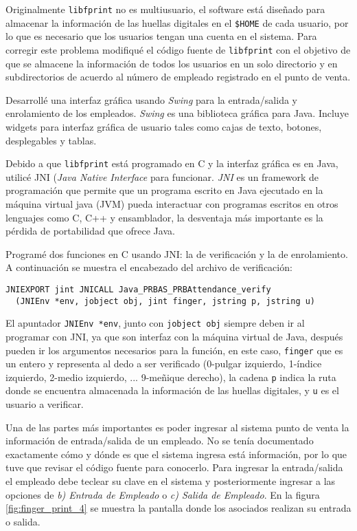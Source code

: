 Originalmente \texttt{libfprint} no es multiusuario, el software está diseñado para almacenar la información de las huellas digitales en el \texttt{\$HOME} de cada usuario, por lo que es necesario que los usuarios tengan una cuenta en el sistema. Para corregir este problema modifiqué el código fuente de \texttt{libfprint} con el objetivo de que se almacene la información de todos los usuarios en un solo directorio y en subdirectorios de acuerdo al número de empleado registrado en el punto de venta.

Desarrollé una interfaz gráfica usando \textit{Swing} para la entrada/salida y enrolamiento de los empleados. \textit{Swing} es una biblioteca gráfica para Java. Incluye widgets para interfaz gráfica de usuario tales como cajas de texto, botones, desplegables y tablas.

Debido a que \texttt{libfprint} está programado en C y la interfaz gráfica es en Java, utilicé JNI (\textit{Java Native Interface} para funcionar. \textit{JNI} es un framework de programación que permite que un programa escrito en Java ejecutado en la máquina virtual java (JVM) pueda interactuar con programas escritos en otros lenguajes como C, C++ y ensamblador, la desventaja más importante es la pérdida de portabilidad que ofrece Java.

Programé dos funciones en C usando JNI: la de verificación y la de enrolamiento. A continuación se muestra el encabezado del archivo de verificación:

\begin{Verbatim}
JNIEXPORT jint JNICALL Java_PRBAS_PRBAttendance_verify
  (JNIEnv *env, jobject obj, jint finger, jstring p, jstring u)
\end{Verbatim}

El apuntador \texttt{JNIEnv *env}, junto con \texttt{jobject obj} siempre deben ir al programar con JNI, ya que son interfaz con la máquina virtual de Java, después pueden ir los argumentos necesarios para la función, en este caso, \texttt{finger} que es un entero y representa al dedo a ser verificado (0-pulgar izquierdo, 1-índice izquierdo, 2-medio izquierdo, ... 9-meñique derecho), la cadena \texttt{p} indica la ruta donde se encuentra almacenada la información de las huellas digitales, y \texttt{u} es el usuario a verificar.

Una de las partes más importantes es poder ingresar al sistema punto de venta la información de entrada/salida de un empleado. No se tenía documentado exactamente cómo y dónde es que el sistema ingresa está información, por lo que tuve que revisar el código fuente para conocerlo. Para ingresar la entrada/salida el empleado debe teclear su clave en el sistema y posteriormente ingresar a las opciones de \textit{b) Entrada de Empleado} o \textit{c) Salida de Empleado}. En la figura \ref{fig:finger_print_4} se muestra la pantalla donde los asociados realizan su entrada o salida.

